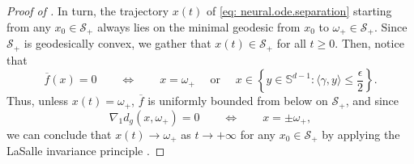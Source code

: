 \documentclass[a4paper,11pt]{article}
\theoremstyle{plain}
\renewcommand{\S}{\mathbb{S}^{d-1}}
\renewcommand{\leq}{\leqslant}
\renewcommand{\geq}{\geqslant}
\numberwithin{equation}{section}
\begin{document}
\begin{proof}[Proof of ]
 In turn, the trajectory $x(t)$ of \eqref{eq: neural.ode.separation} starting from any $x_0\in\mathscr{S}_+$ always lies on the minimal geodesic from $x_0$ to $\omega_+\in\mathscr{S}_+$. Since $\mathscr{S}_+$ is geodesically convex, we gather that $x(t)\in\mathscr{S}_+$ for all $t\geq0$. Then, notice that 
 \begin{equation*}
     \overline{f}(x)=0 \qquad \Longleftrightarrow \qquad x=\omega_+ \quad \text{ or } \quad x\in  \left\{y\in\S:\langle \gamma,y\rangle\leq \frac{\epsilon}{2}\right\}.
 \end{equation*}
 Thus, unless $x(t)=\omega_+$, $\overline{f}$ is uniformly bounded from below on $\mathscr{S}_+$, and since 
 \begin{equation*}
     \nabla_1 d_g(x,\omega_+)=0 \qquad \Longleftrightarrow \qquad x=\pm \omega_+,
 \end{equation*}
 we can conclude that $x(t)\to\omega_+$ as $t\to+\infty$ for any $x_0\in\mathscr{S}_+$ by applying the LaSalle invariance principle \cite{lasalle1960some}.
 


\end{proof}
\end{document}
